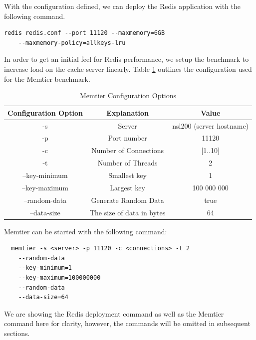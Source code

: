 With the configuration defined, we can deploy the Redis application with the following command.

\begin{lstlisting}
redis redis.conf --port 11120 --maxmemory=6GB
    --maxmemory-policy=allkeys-lru
\end{lstlisting}

In order to get an initial feel for Redis performance, we setup the benchmark to increase load on the cache server linearly. Table \ref{tab:r_memtier_baseline_config} outlines the configuration used for the Memtier benchmark.

\begin{table}[h!]
\centering
\begin{tabular}{| c c c |}
 \hline
 Configuration Option & Explanation & Value\\ [0.5ex]
 \hline\hline

 -s & Server & nsl200 (server hostname) \\
 -p & Port number & 11120 \\
 -c & Number of Connections & [1..10] \\
 -t & Number of Threads & 2 \\
 --key-minimum & Smallest key & 1 \\
 --key-maximum & Largest key & 100 000 000 \\
 --random-data & Generate Random Data & true \\
 --data-size & The size of data in bytes & 64 \\

 \hline

\end{tabular}
\caption{Memtier Configuration Options}
\label{tab:r_memtier_baseline_config}
\end{table}

Memtier can be started with the following command:
\begin{lstlisting}
  memtier -s <server> -p 11120 -c <connections> -t 2
    --random-data
    --key-minimum=1
    --key-maximum=100000000
    --random-data
    --data-size=64
\end{lstlisting}

We are showing the Redis deployment command as well as the Memtier command here for clarity, however, the commands will be omitted in subsequent sections.

